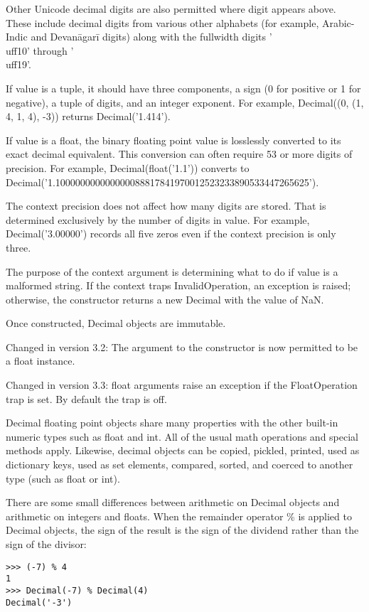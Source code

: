 Other Unicode decimal digits are also permitted where digit appears above. These include decimal digits from various other alphabets (for example, Arabic-Indic and Devanāgarī digits) along with the fullwidth digits '\\uff10' through '\\uff19'.

If value is a tuple, it should have three components, a sign (0 for positive or 1 for negative), a tuple of digits, and an integer exponent. For example, Decimal((0, (1, 4, 1, 4), -3)) returns Decimal('1.414').

If value is a float, the binary floating point value is losslessly converted to its exact decimal equivalent. This conversion can often require 53 or more digits of precision. For example, Decimal(float('1.1')) converts to Decimal('1.100000000000000088817841970012523233890533447265625').

The context precision does not affect how many digits are stored. That is determined exclusively by the number of digits in value. For example, Decimal('3.00000') records all five zeros even if the context precision is only three.

The purpose of the context argument is determining what to do if value is a malformed string. If the context traps InvalidOperation, an exception is raised; otherwise, the constructor returns a new Decimal with the value of NaN.

Once constructed, Decimal objects are immutable.


Changed in version 3.2: The argument to the constructor is now permitted to be a float instance.


Changed in version 3.3: float arguments raise an exception if the FloatOperation trap is set. By default the trap is off.

Decimal floating point objects share many properties with the other built-in numeric types such as float and int. All of the usual math operations and special methods apply. Likewise, decimal objects can be copied, pickled, printed, used as dictionary keys, used as set elements, compared, sorted, and coerced to another type (such as float or int).

There are some small differences between arithmetic on Decimal objects and arithmetic on integers and floats. When the remainder operator \% is applied to Decimal objects, the sign of the result is the sign of the dividend rather than the sign of the divisor:

\begin{lstlisting}
>>> (-7) % 4
1
>>> Decimal(-7) % Decimal(4)
Decimal('-3')
\end{lstlisting}


